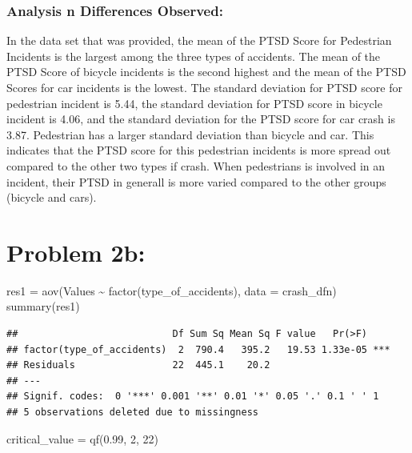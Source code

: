 \documentclass[
]{article}
\newenvironment{Shaded}{\begin{snugshade}}{\end{snugshade}}
\newcommand{\AttributeTok}[1]{\textcolor[rgb]{0.77,0.63,0.00}{#1}}
\newcommand{\DecValTok}[1]{\textcolor[rgb]{0.00,0.00,0.81}{#1}}
\newcommand{\FloatTok}[1]{\textcolor[rgb]{0.00,0.00,0.81}{#1}}
\newcommand{\FunctionTok}[1]{\textcolor[rgb]{0.00,0.00,0.00}{#1}}
\newcommand{\NormalTok}[1]{#1}
\newcommand{\OtherTok}[1]{\textcolor[rgb]{0.56,0.35,0.01}{#1}}
\newcommand{\SpecialCharTok}[1]{\textcolor[rgb]{0.00,0.00,0.00}{#1}}
\begin{document}
\hypertarget{analysis-n-differences-observed}{%
\subsubsection{Analysis n Differences
Observed:}\label{analysis-n-differences-observed}}

In the data set that was provided, the mean of the PTSD Score for
Pedestrian Incidents is the largest among the three types of accidents.
The mean of the PTSD Score of bicycle incidents is the second highest
and the mean of the PTSD Scores for car incidents is the lowest. The
standard deviation for PTSD score for pedestrian incident is 5.44, the
standard deviation for PTSD score in bicycle incident is 4.06, and the
standard deviation for the PTSD score for car crash is 3.87. Pedestrian
has a larger standard deviation than bicycle and car. This indicates
that the PTSD score for this pedestrian incidents is more spread out
compared to the other two types if crash. When pedestrians is involved
in an incident, their PTSD in generall is more varied compared to the
other groups (bicycle and cars).

\hypertarget{problem-2b}{%
\section{Problem 2b:}\label{problem-2b}}

\begin{Shaded}
\begin{Highlighting}[]
\NormalTok{res1 }\OtherTok{=} \FunctionTok{aov}\NormalTok{(Values }\SpecialCharTok{\textasciitilde{}} \FunctionTok{factor}\NormalTok{(type\_of\_accidents), }\AttributeTok{data =}\NormalTok{ crash\_dfn)}
\FunctionTok{summary}\NormalTok{(res1)}
\end{Highlighting}
\end{Shaded}

\begin{verbatim}
##                           Df Sum Sq Mean Sq F value   Pr(>F)    
## factor(type_of_accidents)  2  790.4   395.2   19.53 1.33e-05 ***
## Residuals                 22  445.1    20.2                     
## ---
## Signif. codes:  0 '***' 0.001 '**' 0.01 '*' 0.05 '.' 0.1 ' ' 1
## 5 observations deleted due to missingness
\end{verbatim}

\begin{Shaded}
\begin{Highlighting}[]
\NormalTok{critical\_value }\OtherTok{=} \FunctionTok{qf}\NormalTok{(}\FloatTok{0.99}\NormalTok{, }\DecValTok{2}\NormalTok{, }\DecValTok{22}\NormalTok{)}
\end{Highlighting}
\end{Shaded}
\end{document}
